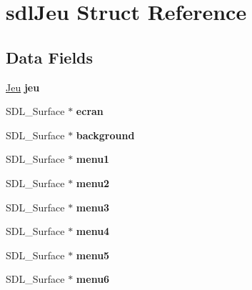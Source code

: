 \hypertarget{structsdl_jeu}{\section{sdl\-Jeu Struct Reference}
\label{structsdl_jeu}
}
\subsection*{Data Fields}
\begin{DoxyCompactItemize}
\item 
\hypertarget{structsdl_jeu_a56ca1ac56f66324ba9bc5868128ddb84}{\hyperlink{struct_jeu}{Jeu} {\bfseries jeu}}\label{structsdl_jeu_a56ca1ac56f66324ba9bc5868128ddb84}

\item 
\hypertarget{structsdl_jeu_ad7336f08728614cd400604d2ba6ca1ef}{S\-D\-L\-\_\-\-Surface $\ast$ {\bfseries ecran}}\label{structsdl_jeu_ad7336f08728614cd400604d2ba6ca1ef}

\item 
\hypertarget{structsdl_jeu_a1dc412c7336b84d36cdc37c46f17aa8a}{S\-D\-L\-\_\-\-Surface $\ast$ {\bfseries background}}\label{structsdl_jeu_a1dc412c7336b84d36cdc37c46f17aa8a}

\item 
\hypertarget{structsdl_jeu_ab68fe3cac9080aba34a48230510a588b}{S\-D\-L\-\_\-\-Surface $\ast$ {\bfseries menu1}}\label{structsdl_jeu_ab68fe3cac9080aba34a48230510a588b}

\item 
\hypertarget{structsdl_jeu_a14a86c18ba3cc7760ab378e6c0c02f42}{S\-D\-L\-\_\-\-Surface $\ast$ {\bfseries menu2}}\label{structsdl_jeu_a14a86c18ba3cc7760ab378e6c0c02f42}

\item 
\hypertarget{structsdl_jeu_ae44ec09e88df0781566d30744c84df60}{S\-D\-L\-\_\-\-Surface $\ast$ {\bfseries menu3}}\label{structsdl_jeu_ae44ec09e88df0781566d30744c84df60}

\item 
\hypertarget{structsdl_jeu_a13a5b521fa7517f593bcd24bac7aa41c}{S\-D\-L\-\_\-\-Surface $\ast$ {\bfseries menu4}}\label{structsdl_jeu_a13a5b521fa7517f593bcd24bac7aa41c}

\item 
\hypertarget{structsdl_jeu_a99b0b6edd790d15e8a4da7534cd196d5}{S\-D\-L\-\_\-\-Surface $\ast$ {\bfseries menu5}}\label{structsdl_jeu_a99b0b6edd790d15e8a4da7534cd196d5}

\item 
\hypertarget{structsdl_jeu_a66a9c126903310457c6b78f452c84b0d}{S\-D\-L\-\_\-\-Surface $\ast$ {\bfseries menu6}}\label{structsdl_jeu_a66a9c126903310457c6b78f452c84b0d}


\end{DoxyCompactItemize}
